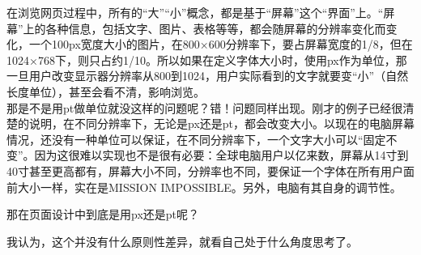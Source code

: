 \documentclass[12pt]{article}
\begin{document}

\setlength{\columnsep}{12pt}    %
\setlength{\columnseprule}{1pt} %
\begin{multicols}{4}
在浏览网页过程中，所有的“大”“小”概念，都是基于“屏幕”这个“界面”上。“屏幕”上的各种信息，包括文字、图片、表格等等，都会随屏幕的分辨率变化而变化，一个100px宽度大小的图片，在800×600分辨率下，要占屏幕宽度的1/8，但在1024×768下，则只占约1/10。所以如果在定义字体大小时，使用px作为单位，那一旦用户改变显示器分辨率从800到1024，用户实际看到的文字就要变“小”（自然长度单位），甚至会看不清，影响浏览。\\
那是不是用pt做单位就没这样的问题呢？错！问题同样出现。刚才的例子已经很清楚的说明，在不同分辨率下，无论是px还是pt，都会改变大小。以现在的电脑屏幕情况，还没有一种单位可以保证，在不同分辨率下，一个文字大小可以“固定不变”。因为这很难以实现也不是很有必要：全球电脑用户以亿来数，屏幕从14寸到40寸甚至更高都有，屏幕大小不同，分辨率也不同，要保证一个字体在所有用户面前大小一样，实在是MISSION IMPOSSIBLE。另外，电脑有其自身的调节性。

那在页面设计中到底是用px还是pt呢？

我认为，这个并没有什么原则性差异，就看自己处于什么角度思考了。
\end{multicols}

\newpage
\pagebreak[3]
\nopagebreak[2]
\clearpage
\end{document}
